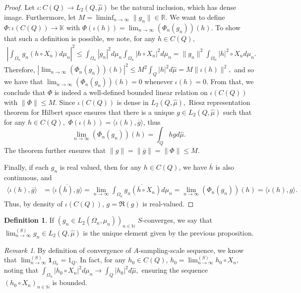 \documentclass{amsart}
\theoremstyle{definition}
\newtheorem{definition}[thm]{Definition}
\theoremstyle{remark}
\newtheorem{remark}[thm]{Remark}
\def \HMU{\hat{\mu}}
\def \LL{\langle}
\def \RR{\rangle}
\begin{document}
\begin{proof}
	Let $\iota:C(Q)\rightarrow L_2(Q,\HMU)$ be the natural inclusion, which has dense image. Furthermore, let $M=\liminf_{n\rightarrow\infty}\|g_n\|\in\mathbb{R}.$ We want to define $\Phi:\iota(C(Q))\rightarrow\mathbb{K}$ with $\Phi(\iota(h))=\lim_{n\rightarrow\infty} (\Phi_n(g_n))(h).$ To show that such a definition is possible, we note, for any $h\in C(Q),$
	\begin{align*}
		\left|\int_{\Omega_n}g_n(h\circ X_n)d\mu_n\right|^2\leq\int_{\Omega_n}|g_n|^2d\mu_n \int_{\Omega_n}|h\circ X_n|^2d\mu_n= \|g_n\|^2 \int_{\Omega_n}|h|^2\circ X_nd\mu_n.
	\end{align*}
	Therefore, $|\lim_{n\rightarrow\infty}(\Phi_n(g_n))(h)|^2\leq M^2\int_{Q}|h|^2d\HMU=M\|\iota(h)\|^2,$ and so we have that $\lim_{n\rightarrow\infty}(\Phi_n(g_n))(h)=0$ whenever $\iota(h)=0.$ From that, we conclude that $\Phi$ is indeed a well-defined bounded linear relation on $\iota(C(Q))$ with $\|\Phi\|\leq M.$ Since $\iota(C(Q))$ is dense in $L_2(Q,\HMU),$ Riesz representation theorem for Hilbert space ensures that there is a unique $g\in L_2(Q,\HMU)$ such that for any $h\in C(Q),$ $\Phi(\iota(h))=\LL \iota(h), \overline{g}\RR$, thus $$\lim_{n\rightarrow\infty}(\Phi_n(g_n))(h)=\int_{Q}h gd\HMU.$$ The theorem further ensures that $\|g\|=\|\overline{g}\|=\|\Phi\|\leq M.$
	
	Finally, if each $g_n$ is real valued, then for any $h\in C(Q)$, we have $\overline{h}$ is also continuous, and
	\begin{align*}
		\LL \iota(h), \overline{g}\RR&= \overline{\LL \iota(\overline{h}), g\RR}=\lim_{n\rightarrow\infty}\overline{\int_{\Omega_n}g_n (\overline{h}\circ X_n)d\mu_n}=\lim_{n\rightarrow\infty}(\Phi_n(g_n))(h)=\LL \iota(h),g\RR.
	\end{align*}
	Thus, by density of $\iota(C(Q))$, $g=\Re(g)$ is real-valued.
\end{proof}
\begin{definition}
	If $(g_n\in L_2(\Omega_n,\mu_n))_{n\in\mathbb{N}}$ $S$-converges, we say that $\lim_{n\rightarrow\infty}^{(S)} g_n \in L_2(Q,\HMU)$ is the unique element given by the previous proposition.
\end{definition}
\begin{remark}\label{remark_continuous_convergence}
	By definition of convergence of $A$-sampling-scale sequence, we know that $\lim^{(S)}_{n\rightarrow\infty}\mathbf{1}_{\Omega_n}=1_{Q}.$ In fact, for any $h_0\in C(Q)$, $h_0=\lim^{(S)}_{n\rightarrow\infty}h_0\circ X_n,$ noting that $\int_{\Omega_n}|h_0\circ X_n|^2d\mu_n\rightarrow \int_{Q}|h_0|^2d\HMU,$ ensuring the sequence $(h_0\circ X_n)_{n\in\mathbb{N}}$ is bounded.
\end{remark}
\end{document}
